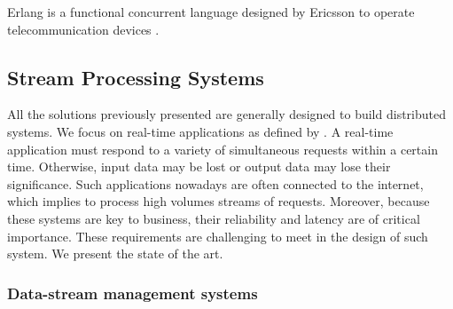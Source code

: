 Erlang is a functional concurrent language designed by Ericsson to operate telecommunication devices \cite{JoeArmstrong}.

\subsection{Stream Processing Systems} \label{chapter3:parallel-execution:stream-processing}

All the solutions previously presented are generally designed to build distributed systems.
We focus on real-time applications as defined by \cite{Hansen1978}.
A real-time application must respond to a variety of simultaneous requests within a certain time.
Otherwise, input data may be lost or output data may lose their significance.
Such applications nowadays are often connected to the internet, which implies to process high volumes streams of requests.
Moreover, because these systems are key to business, their reliability and latency are of critical importance.
These requirements are challenging to meet in the design of such system.
We present the state of the art.



\subsubsection{Data-stream management systems}

